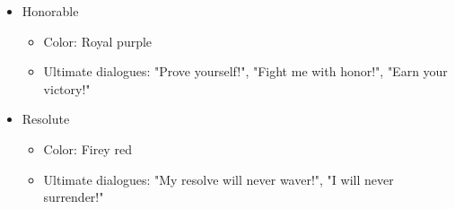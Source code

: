 \documentclass{report}
\begin{document}
\begin{itemize}
            \item Honorable \begin{itemize}
                \item Color: Royal purple
                \item Ultimate dialogues: "Prove yourself!", "Fight me with honor!", "Earn your victory!"
            \end{itemize}     

            \item Resolute \begin{itemize}
                \item Color: Firey red
                \item Ultimate dialogues: "My resolve will never waver!", "I will never surrender!"
            \end{itemize}                  

        \end{itemize}
\end{document}
